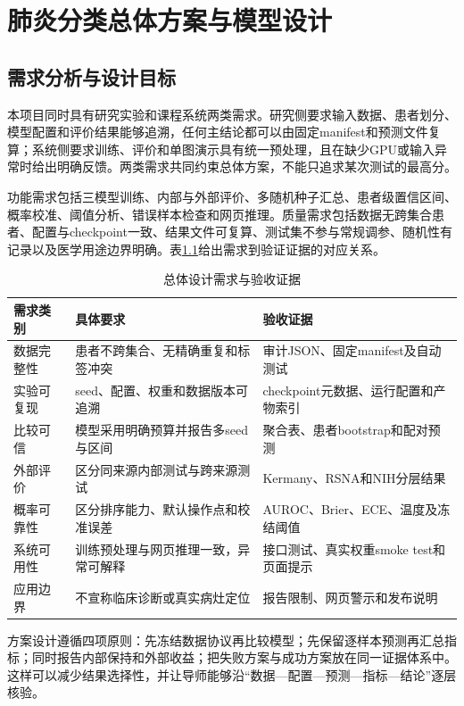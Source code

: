 \chapter{肺炎分类总体方案与模型设计}

\section{需求分析与设计目标}

本项目同时具有研究实验和课程系统两类需求。研究侧要求输入数据、患者划分、模型配置和评价结果能够追溯，任何主结论都可以由固定manifest和预测文件复算；系统侧要求训练、评价和单图演示具有统一预处理，且在缺少GPU或输入异常时给出明确反馈。两类需求共同约束总体方案，不能只追求某次测试的最高分。

功能需求包括三模型训练、内部与外部评价、多随机种子汇总、患者级置信区间、概率校准、阈值分析、错误样本检查和网页推理。质量需求包括数据无跨集合患者、配置与checkpoint一致、结果文件可复算、测试集不参与常规调参、随机性有记录以及医学用途边界明确。表\ref{tab:design_requirements}给出需求到验证证据的对应关系。

\begin{table}[H]
\centering
\caption{总体设计需求与验收证据}
\label{tab:design_requirements}
\begin{tabularx}{\textwidth}{p{}X X}
\toprule
需求类别 & 具体要求 & 验收证据 \\
\midrule
数据完整性 & 患者不跨集合、无精确重复和标签冲突 & 审计JSON、固定manifest及自动测试 \\
实验可复现 & seed、配置、权重和数据版本可追溯 & checkpoint元数据、运行配置和产物索引 \\
比较可信 & 模型采用明确预算并报告多seed与区间 & 聚合表、患者bootstrap和配对预测 \\
外部评价 & 区分同来源内部测试与跨来源测试 & Kermany、RSNA和NIH分层结果 \\
概率可靠性 & 区分排序能力、默认操作点和校准误差 & AUROC、Brier、ECE、温度及冻结阈值 \\
系统可用性 & 训练预处理与网页推理一致，异常可解释 & 接口测试、真实权重smoke test和页面提示 \\
应用边界 & 不宣称临床诊断或真实病灶定位 & 报告限制、网页警示和发布说明 \\
\bottomrule
\end{tabularx}
\end{table}

方案设计遵循四项原则：先冻结数据协议再比较模型；先保留逐样本预测再汇总指标；同时报告内部保持和外部收益；把失败方案与成功方案放在同一证据体系中。这样可以减少结果选择性，并让导师能够沿“数据—配置—预测—指标—结论”逐层核验。

